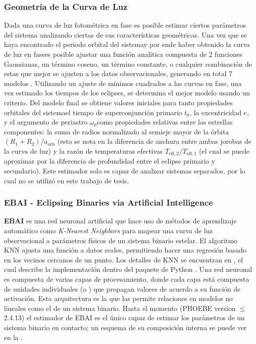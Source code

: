 \subsubsection{Geometría de la Curva de Luz}
Dada una curva de luz fotométrica en fase es posible estimar ciertos parámetros
del sistema analizando ciertas de sus características geométricas. Una vez que
se haya encontrado el periodo orbital del sistema\textemdash y por ende haber
obtenido la curva de luz en fase\textemdash es posible ajustar una función
analítica compuesta de 2 funciones Gaussianas, un término coseno, un término
constante, o cualquier combinación de estas que mejor se ajusten a los datos
observacionales, generando en total 7 modelos
. Utilizando un
ajuste de mínimos cuadrados a las curvas en fase, una vez estimado los tiempos
de los eclipses, se determina el mejor modelo usando un criterio. Del modelo
final se obtiene valores iniciales para tanto propiedades orbitales del
sistema\textemdash el tiempo de superconjunción primario $t_0$, la excentricidad
$e$, y el argumento de periastro $\omega_0$\textemdash como propiedades
relativas entre las estrellas componentes: la suma de radios normalizado al
semieje mayor de la órbita $(R_1 + R_2)/a_{\mathrm{orb}}$ (esto se nota en la
diferencia de anchura entre ambas jorobas de la curva de luz) y la razón de
temperaturas efectivas $T_{\mathrm{eff},2}/T_{\mathrm{eff},1}$ (el cual se puede
aproximar por la diferencia de profundidad entre el eclipse primario y
secundario). Este estimador solo es capaz de analizar sistemas separados, por lo
cual no se utilizó en este trabajo de tesis.

\subsubsection{EBAI - Eclipsing Binaries via Artificial Intelligence}
\textbf{EBAI} es una red neuronal artificial que hace uso de métodos de
aprendizaje automático como \textit{K-Nearest Neighbors} para mapear una curva
de luz observacional a parámetros físicos de un sistema binario estelar. El
algoritmo KNN ajusta una función a datos reales, permitiendo hacer una regresión
basado en los vecinos cercanos de un punto. Los detalles de KNN se encuentran en
, el cual describe la implementación
dentro del paquete de Python . Una red neuronal es compuesta
de varias capas de procesamiento, donde cada capa está compuesta de unidades
individuales (o ) que propagan valores de acuerdo a su función
de activación. Esta arquitectura es la que las permite 
relaciones en modelos no lineales como el de un sistema binario. Hasta el
momento (PHOEBE version $\leq$2.4.13) el estimador de EBAI es el único capaz de
estimar los parámetros de un sistema binario en contacto; un esquema de su
composición interna se puede ver en la .

